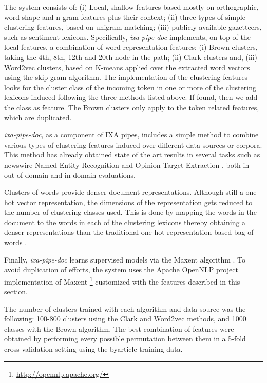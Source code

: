 \documentclass[information,article,submit,moreauthors,pdftex,10pt,a4paper]{Definitions/mdpi}
\begin{document}
The system consists of: (i) Local, shallow features based mostly on orthographic, word shape and n-gram features plus their context; (ii) three types of simple clustering features, based on unigram matching; (iii) publicly available gazetteers, such as sentiment lexicons. Specifically, \emph{ixa-pipe-doc} implements, on top of the local features, a combination of word representation features: (i) Brown \cite{brown1992class} clusters, taking the 4th, 8th, 12th and 20th node in the path; (ii) Clark \cite{clark2003combining} clusters and, (iii) Word2vec \cite{mikolov2013distributed} clusters, based on K-means applied over the extracted word vectors using the skip-gram algorithm. The implementation of the clustering features looks for the cluster class of the incoming token in one or more of the clustering lexicons induced following the three methods listed above. If found, then we add the class as feature. The Brown clusters only apply to the token related features, which are duplicated.

\emph{ixa-pipe-doc}, as a component of IXA pipes, includes a simple method to combine various types of clustering features induced over different data sources or corpora. This method has already obtained state of the art results in several tasks such as newswire Named Entity Recognition \cite{agerri2016robust} and Opinion Target Extraction \cite{agerri2019language}, both in out-of-domain and in-domain evaluations.

Clusters of words provide denser document representations. Although still a one-hot vector representation, the dimensions of the representation gets reduced to the number of clustering classes used. This is done by mapping the words in the document to the words in each of the clustering lexicons thereby obtaining a denser representations than the traditional one-hot representation based bag of words \cite{turian-ratinov-bengio:2010:ACL}.

Finally, \emph{ixa-pipe-doc} learns supervised models via the Maxent algorithm \cite{ratnaparkhi1999learning}. To avoid duplication of efforts, the system uses the Apache OpenNLP project implementation of Maxent \footnote{\url{http://opennlp.apache.org/}} customized with the features described in this section.

The number of clusters trained with each algorithm and data source was the following: 100-800 clusters using the Clark and Word2vec methods, and 1000 classes with the Brown algorithm. The best combination of features were obtained by performing every possible permutation between them in a 5-fold cross validation setting using the byarticle training data.
\end{document}
